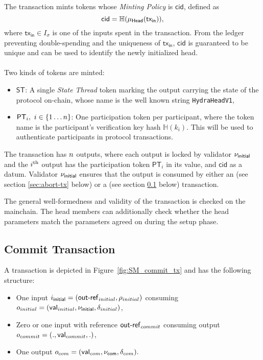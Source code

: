 \noindent The \mtxInit{} transaction mints tokens whose \emph{Minting Policy} is $\mathsf{cid}$, defined as 
$$
\mathsf{cid} = \mathbb{H}(\mu_\mathsf{Head}(\mathsf{tx_{in}})),
$$
where $\mathsf{tx_{in}} \in I_\sigma$ is one of the inputs spent in the \mtxInit{} transaction. From the ledger preventing double-spending and the uniqueness of $\mathsf{tx_{in}}$, $\mathsf{cid}$ is guaranteed to be unique and can be used to identify the newly initialized head. \\
\\
Two kinds of tokens are minted:
\begin{itemize}
\item $\mathsf{ST}$: A single \emph{State Thread} token marking the output carrying the state of the protocol on-chain, whose name is the well known string \texttt{HydraHeadV1},
\item $\mathsf{PT}_i,\ i\in \{1 \dots n \}$: One participation token per participant, where the token name is the participant's verification key hash $\mathbb{H}(k_i)$. This will be used to authenticate participants in protocol transactions.
\end{itemize} 

\noindent The \mtxInit{} transaction has $n$ outputs, where each output is
locked by validator $\nu_\mathsf{initial}$ and the $i^{\text{th}}$ output has the participation
token $\mathsf{PT}_i$ in its value, and $\mathsf{cid}$ as a datum. Validator $\nu_\mathsf{initial}$
ensures that the output is consumed by either an \mtxAbort{} (see section \ref{sec:abort-tx} below) or a \mtxCom{} (see section \ref{sec:commit-tx} below) transaction.

The general well-formedness and validity of the \mtxInit{} transaction is
checked on the mainchain. The head members can additionally check whether the head
parameters match the parameters agreed on during the setup phase.



\subsection{Commit Transaction}\label{sec:commit-tx}

A \mtxCom{} transaction is depicted in Figure~\ref{fig:SM_commit_tx} and has the following structure:
\begin{itemize}
    \item One input $i_{\mathsf{initial}} = (\mathsf{out\textsf{-}{}ref}_{initial}, \rho_{initial})$ consuming $o_{initial} = (\mathsf{val}_{initial}, \nu_\mathsf{initial}, \delta_{initial})$,
    \item Zero or one input with reference $\mathsf{out\textsf{-}{}ref}_{commit}$ consuming output $o_{commit} = (.,\mathsf{val}_{commit},.)$,
    \item One output $o_{com} =  (\mathsf{val}_{com}, \nu_\mathsf{com}, \delta_{com}).$ 
\end{itemize}

